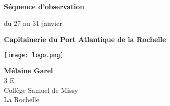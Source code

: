 


\begin{titlepage}
  \begin{center}
    \vspace*{1cm}

    \Large
    \textbf{Séquence d'observation}

    \vspace{0.5cm}
    \Large
    du 27 au 31 janvier

    \vspace{1.5cm}

    \Huge
    \textbf{Capitainerie
    du Port Atlantique de la Rochelle}

    \vspace{1.5cm}
    \center
    \texttt{[image: logo.png]}
    \vfill



    \Large
    \textbf{Mélaine Garel}\\
    \large
    3 E\\
    \vspace{0.5cm}
    Collège Samuel de Missy\\
    La Rochelle\\

  \end{center}
\end{titlepage}

